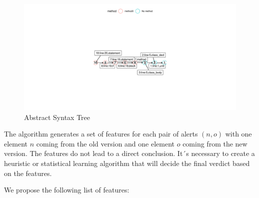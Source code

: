 \documentclass[
]{article}
\begin{document}

\begin{figure}[H]
\includegraphics[width=1\linewidth]{report_files/figure-latex/unnamed-chunk-5-1} \caption{Abstract Syntax Tree \label{AST_alert_1}}\label{fig:unnamed-chunk-5}
\end{figure}


The algorithm generates a set of features for each pair of alerts
\((n,o)\) with one element \(n\) coming from the old version and one
element \(o\) coming from the new version. The features do not lead to a
direct conclusion. It´s necessary to create a heuristic or statistical
learning algorithm that will decide the final verdict based on the
features.

We propose the following list of features:
\end{document}
